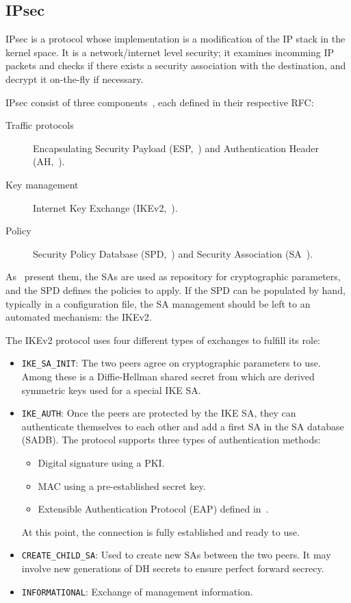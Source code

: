 \subsection{IPsec}
IPsec is a protocol whose implementation is a modification of the IP stack in the kernel space.
It is a network/internet level security; it examines incomming IP packets and checks if there exists a security association with the destination, and decrypt it on-the-fly if necessary.


IPsec consist of three components~\cite{cryptoencyclopedia2011}, each defined in their respective RFC:
\begin{description}
	\item[Traffic protocols] Encapsulating Security Payload (ESP,~\cite{rfc4303}) and Authentication Header (AH,~\cite{rfc4302}).
	\item[Key management] Internet Key Exchange (IKEv2,~\cite{rfc7296}).
	\item[Policy]Security Policy Database (SPD,~\cite{rfc4301}) and Security Association (SA~\cite{rfc4301}).
\end{description}

As~\citet{Paterson200672} present them, the SAs are used as repository for cryptographic parameters, and the SPD defines the policies to apply.
If the SPD can be populated by hand, typically in a configuration file, the SA management should be left to an automated mechanism: the IKEv2.

\noindent The IKEv2 protocol uses four different types of exchanges to fulfill its role:
\begin{itemize}
	\item \texttt{IKE\_SA\_INIT}: The two peers agree on cryptographic parameters to use. Among these is a Diffie-Hellman shared secret from which are derived symmetric keys used for a special IKE SA.
	\item \texttt{IKE\_AUTH}: Once the peers are protected by the IKE SA, they can authenticate themselves to each other and add a first SA in the SA database (SADB).
	The protocol supports three types of authentication methods:
	\begin{itemize}
		\item Digital signature using a PKI.
		\item MAC using a pre-established secret key.
		\item Extensible Authentication Protocol (EAP) defined in~\citet{rfc3748}.
	\end{itemize}
	At this point, the connection is fully established and ready to use.
	\item \texttt{CREATE\_CHILD\_SA}: Used to create new SAs between the two peers. It may involve new generations of DH secrets to ensure perfect forward secrecy.
	\item \texttt{INFORMATIONAL}: Exchange of management information.
\end{itemize}
~\newline{}

